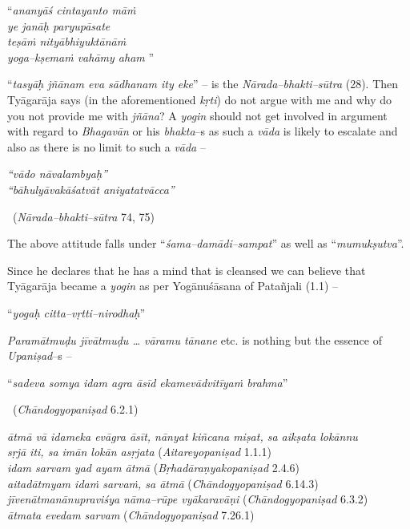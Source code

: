 \begin{myquote}
“\textit{ananyāś cintayanto māṁ}\\\textit{ye janāḥ paryupāsate }\\\textit{teṣāṁ nityābhiyuktānāṁ}\\\textit{yoga–kṣemaṁ vahāmy aham} ”
\end{myquote}

“\textit{tasyāḥ jñānam eva sādhanam ity eke}” – is the \textit{Nārada–bhakti–sūtra} (28). Then Tyāgarāja says (in the aforementioned \textit{kṛti}) do not argue with me and why do you not provide me with \textit{jñāna}? A \textit{yogin} should not get involved in argument with regard to \textit{Bhagavān} or his \textit{bhakta}–s as such a \textit{vāda} is likely to escalate and also as there is no limit to such a \textit{vāda} –

\begin{myquote}
\textit{“vādo nāvalambyaḥ”}\\\textit{“bāhulyāvakāśatvāt aniyatatvācca”} 

~\hfill (\textit{Nārada–bhakti–sūtra} 74, 75)
\end{myquote}

The above attitude falls under “\textit{śama–damādi–sampat}” as well as “\textit{mumukṣutva}”.

Since he declares that he has a mind that is cleansed we can believe that Tyāgarāja became a \textit{yogin} as per Yogānuśāsana of Patañjali (1.1) –

\begin{myquote}
“\textit{yogaḥ citta–vṛtti–nirodhaḥ}”
\end{myquote}

\textit{Paramātmuḍu jīvātmuḍu … vāramu tānane} etc. is nothing but the essence of \textit{Upaniṣad}–s –

\begin{myquote}
“\textit{sadeva somya idam agra āsīd ekamevādvitīyaṁ brahma}” 

~\hfill (\textit{Chāndogyopaniṣad} 6.2.1)
\end{myquote}

\begin{myquote}
\textit{ātmā vā idameka evāgra āsīt, nānyat kiñcana miṣat, sa aikṣata lokānnu}\\\textit{sṛjā iti, sa imān lokān asṛjata} (\textit{Aitareyopaniṣad} 1.1.1)\\\textit{idam sarvam yad ayam ātmā} (\textit{Bṛhadāraṇyakopaniṣad} 2.4.6)\\\textit{aitadātmyam idaṁ sarvaṁ, sa ātmā} (\textit{Chāndogyopaniṣad} 6.14.3)\\\textit{jīvenātmanānupraviśya nāma–rūpe vyākaravāṇi} (\textit{Chāndogyopaniṣad} 6.3.2)\\\textit{ātmata evedam sarvam} (\textit{Chāndogyopaniṣad} 7.26.1)
\end{myquote}


